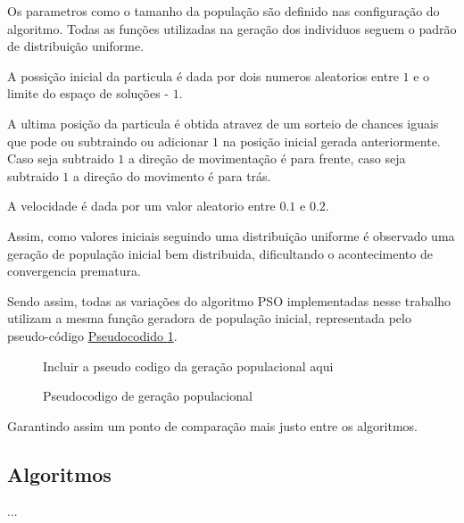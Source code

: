         Os parametros como o tamanho da população são definido nas configuração do algoritmo. Todas as funções utilizadas na geração dos individuos seguem o padrão de distribuição uniforme.\newline
        
        A possição inicial da particula é dada por dois numeros aleatorios entre $1$ e o limite do espaço de soluções - $1$.\newline
        
        A ultima posição da particula é obtida atravez de um sorteio de chances iguais que pode ou subtraindo ou adicionar $1$ na posição inicial gerada anteriormente. Caso seja subtraido $1$ a direção de movimentação é para frente, caso seja subtraido $1$ a direção do movimento é para trás.\newline

        A velocidade é dada por um valor aleatorio entre $0.1$ e $0.2$.\newline

        Assim, como valores iniciais seguindo uma distribuição uniforme é observado uma geração de população inicial bem distribuida, dificultando o acontecimento de convergencia prematura.
        
        Sendo assim, todas as variações do algoritmo PSO implementadas nesse trabalho utilizam a mesma função geradora de população inicial, representada pelo pseudo-código \hyperref[cod:geracao-pop]{Pseudocodido \ref{cod:geracao-pop}}.
        
        \begin{figure}[h]
            \centering
            \small{Incluir a pseudo codigo da geração populacional aqui}
            \caption{Pseudocodigo de geração populacional}
            \label{cod:geracao-pop}
        \end{figure}
        
        \noindent Garantindo assim um ponto de comparação mais justo entre os algoritmos.



    \subsection{Algoritmos}
            ...

